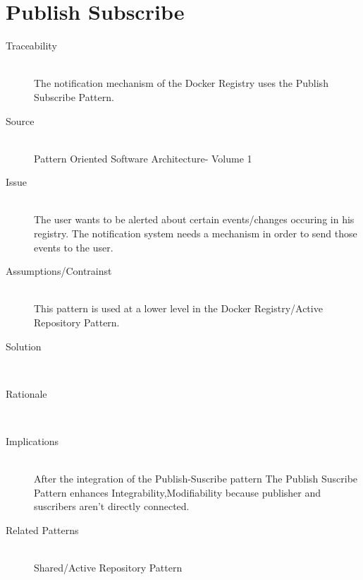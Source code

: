 \section{Publish Subscribe}
\begin{description}

\item[Traceability]~\\
The notification mechanism of the Docker Registry uses the Publish Subscribe Pattern.

\item[Source]~\\
Pattern Oriented Software Architecture- Volume 1

\item[Issue]~\\ The user wants to be alerted about certain events/changes occuring in his registry.
The notification system needs a mechanism in order to send those events to the user.

\item[Assumptions/Contrainst]~\\ This pattern is used at a lower level in the Docker Registry/Active Repository Pattern.

\item[Solution]~\\

\item[Rationale]~\\ 


\item[Implications]~\\ After the integration of the Publish-Suscribe pattern %
The Publish Suscribe Pattern enhances Integrability,Modifiability because publisher and suscribers aren't directly connected.%

\item [Related Patterns]~\\
Shared/Active Repository Pattern


\end{description}

